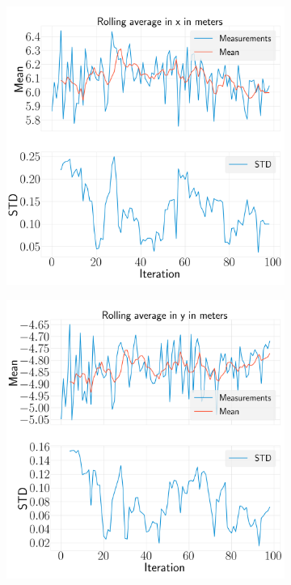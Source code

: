 \documentclass[../Head/report.tex]{subfiles}
\begin{document}
\begin{figure}[H]
    \centering
    \begin{subfigure}[t]{.30\textwidth}
        \centering
        \includegraphics[width=\textwidth]{../Figures/analyse_rolling_average/test2/Calculated_rolling_average_in_x_with_mean_and_STD.png}
        \caption{}
        \label{fig:rolling_average_in_x_test2}
    \end{subfigure}
     \hspace{0.2em}
    \begin{subfigure}[t]{.30\textwidth}
        \centering
        \includegraphics[width=\textwidth]{../Figures/analyse_rolling_average/test2/Calculated_rolling_average_in_y_with_mean_and_STD.png}

\end{subfigure}
\end{figure}
\end{document}
